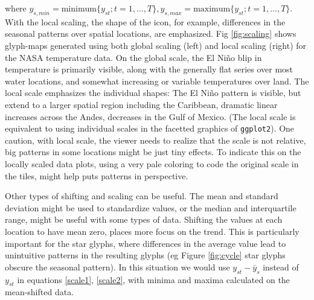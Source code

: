 \documentclass[oneside]{article}
\begin{document}
\noindent where $y_{s, min} = \mbox{minimum}\{y_{st}; t=1, ..., T \}, y_{s,max} = \mbox{maximum}\{y_{st}; t=1, ..., T\}$. With the local scaling, the shape of the icon, for example, differences in the seasonal patterns over spatial locations, are emphasized.  Fig \ref{fig:scaling} shows glyph-maps generated using both global scaling (left) and local scaling (right) for the NASA temperature data. On the global scale, the El Ni\~no blip in temperature is primarily visible, along with the generally flat series over most water locations, and somewhat increasing or variable temperatures over land. The local scale emphasizes the individual shapes: The El Ni\~no pattern is visible, but extend to a larger spatial region including the Caribbean, dramatic linear increases across the Andes, decreases in the Gulf of Mexico. (The local scale is equivalent to using individual scales in the facetted graphics of \texttt{ggplot2}). One caution, with local scale, the viewer needs to realize that the scale is not relative, big patterns in some locations might be just tiny effects. To indicate this on the locally scaled data plots, using a very pale coloring to code the original scale in the tiles, might help puts patterns in perspective.

Other types of shifting and scaling can be useful. The mean and standard deviation might be used to standardize values, or the median and interquartile range, might be useful with some types of data. Shifting the values at each location to have mean zero, places more focus on the trend. This is particularly important for the star glyphs, where differences in the average value lead to unintuitive patterns in the resulting glyphs (eg Figure \ref{fig:cycle} star glyphs obscure the seasonal pattern).  In this situation we would use $y_{st}-\bar{y}_s$ instead of $y_{st}$ in equations \ref{scale1}, \ref{scale2}, with minima and maxima calculated on the mean-shifted data.



\end{document}
